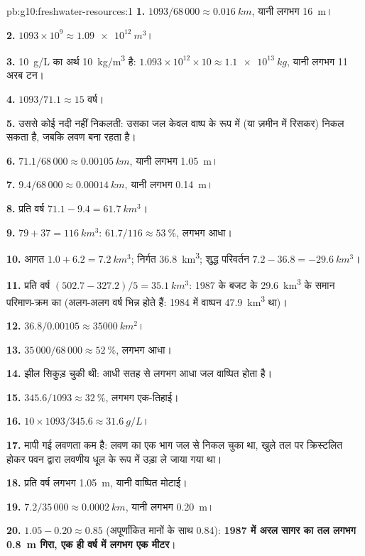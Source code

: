 \begin{solution}{pb:g10:freshwater-resources:1}
\textbf{1.} $1093/68\,000 \approx \qty{0.016}{km}$, यानी लगभग \qty{16}{m}।

\textbf{2.} $1093 \times 10^9 \approx \qty{1.09e12}{m^3}$।

\textbf{3.} \qty{10}{g/L} का अर्थ \qty{10}{kg/m^3} है: $1.093 \times 10^{12} \times 10
\approx \qty{1.1e13}{kg}$, यानी लगभग \num{11} अरब टन।

\textbf{4.} $1093/71.1 \approx 15$ वर्ष।

\textbf{5.} उससे कोई नदी नहीं निकलती: उसका जल केवल वाष्प के रूप में (या
ज़मीन में रिसकर) निकल सकता है, जबकि लवण बना रहता है।

\textbf{6.} $71.1/68\,000 \approx \qty{0.00105}{km}$, यानी लगभग \qty{1.05}{m}।

\textbf{7.} $9.4/68\,000 \approx \qty{0.00014}{km}$, यानी लगभग \qty{0.14}{m}।

\textbf{8.} प्रति वर्ष $71.1 - 9.4 = \qty{61.7}{km^3}$।

\textbf{9.} $79 + 37 = \qty{116}{km^3}$: $61.7/116 \approx \qty{53}{\percent}$,
लगभग आधा।

\textbf{10.} आगत $1.0 + 6.2 = \qty{7.2}{km^3}$; निर्गत \qty{36.8}{km^3};
शुद्ध परिवर्तन $7.2 - 36.8 = \qty{-29.6}{km^3}$।

\textbf{11.} प्रति वर्ष $(502.7 - 327.2)/5 = \qty{35.1}{km^3}$: 1987 के बजट के
\qty{29.6}{km^3} के समान परिमाण-क्रम का (अलग-अलग वर्ष भिन्न होते हैं: 1984 में वाष्पन
\qty{47.9}{km^3} था)।

\textbf{12.} $36.8/0.00105 \approx \qty{35000}{km^2}$।

\textbf{13.} $35\,000/68\,000 \approx \qty{52}{\percent}$, लगभग आधा।

\textbf{14.} झील सिकुड़ चुकी थी: आधी सतह से लगभग आधा जल
वाष्पित होता है।

\textbf{15.} $345.6/1093 \approx \qty{32}{\percent}$, लगभग एक-तिहाई।

\textbf{16.} $10 \times 1093/345.6 \approx \qty{31.6}{g/L}$।

\textbf{17.} मापी गई लवणता कम है: लवण का एक भाग जल से निकल चुका था,
खुले तल पर क्रिस्टलित होकर पवन द्वारा लवणीय धूल के रूप में उड़ा ले जाया गया था।

\textbf{18.} प्रति वर्ष लगभग \qty{1.05}{m}, यानी वाष्पित मोटाई।

\textbf{19.} $7.2/35\,000 \approx \qty{0.0002}{km}$, यानी लगभग \qty{0.20}{m}।

\textbf{20.} $1.05 - 0.20 \approx 0.85$ (अपूर्णांकित मानों के साथ \num{0.84}):
\textbf{1987 में अरल सागर का तल लगभग \qty{0.8}{m} गिरा, एक ही वर्ष में
लगभग एक मीटर}।
\end{solution}
